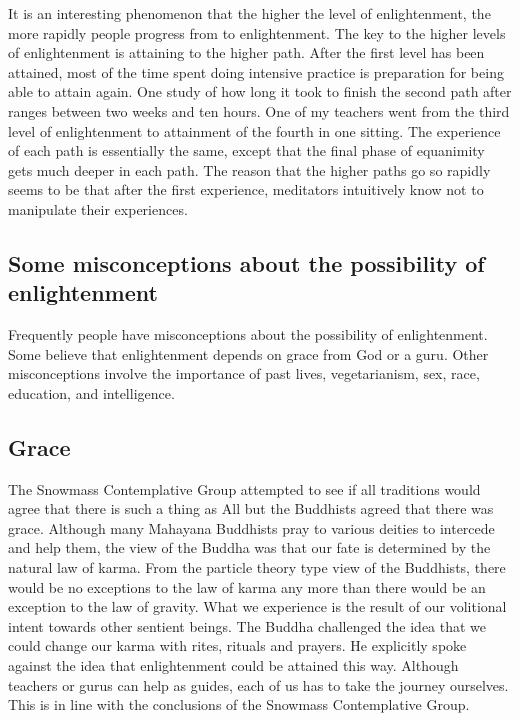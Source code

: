 \documentclass[a5paper,10pt,english]{book}
\begin{document}
\sphinxAtStartPar
It is an interesting phenomenon that the higher the level of
enlightenment, the more rapidly people progress from 
to enlightenment. The key to the higher levels of enlightenment is
attaining  to the higher path. After the first level has
been attained, most of the time spent doing intensive practice is
preparation for being able to attain  again. One study
of how long it took to finish the second path after 
ranges between two weeks and ten hours. One of my teachers went from
the third level of enlightenment to attainment of the fourth in one
sitting. The experience of each path is essentially the same, except
that the final phase of equanimity gets much deeper in each path. The
reason that the higher paths go so rapidly seems to be that after the
first experience, meditators intuitively know not to manipulate their
experiences.


\subsection{Some misconceptions about the possibility of enlightenment}
\label{\detokenize{saints:some-misconceptions-about-the-possibility-of-enlightenment}}
\sphinxAtStartPar
Frequently people have misconceptions about the possibility of
enlightenment. Some believe that enlightenment depends on grace from God
or a guru. Other misconceptions involve the importance of past lives,
vegetarianism, sex, race, education, and intelligence.


\subsection{Grace}
\label{\detokenize{saints:grace}}
\sphinxAtStartPar
The Snowmass Contemplative Group attempted to see if all traditions
would agree that there is such a thing as  All but the
Buddhists agreed that there was grace. Although many Mahayana Buddhists
pray to various deities to intercede and help them, the view of the
Buddha was that our fate is determined by the natural law of karma. From
the particle theory type view of the Buddhists, there would be no
exceptions to the law of karma any more than there would be an exception
to the law of gravity. What we experience is the result of our
volitional intent towards other sentient beings. The Buddha challenged
the idea that we could change our karma with rites, rituals and prayers.
He explicitly spoke against the idea that enlightenment could be
attained this way. Although teachers or gurus can help as guides, each
of us has to take the journey ourselves. This is in line with the
conclusions of the Snowmass Contemplative Group.
\end{document}
